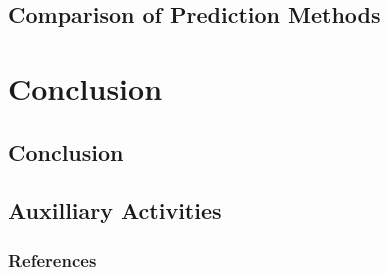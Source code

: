 \documentclass[9pt]{beamer}
\begin{document}
\subsection{Comparison of Prediction Methods}



\section{Conclusion}
\subsection{Conclusion}

\subsection{Auxilliary Activities}



\begin{frame}[allowframebreaks]
  \frametitle{References}
  
  {\footnotesize  }
\end{frame}


\end{document}
